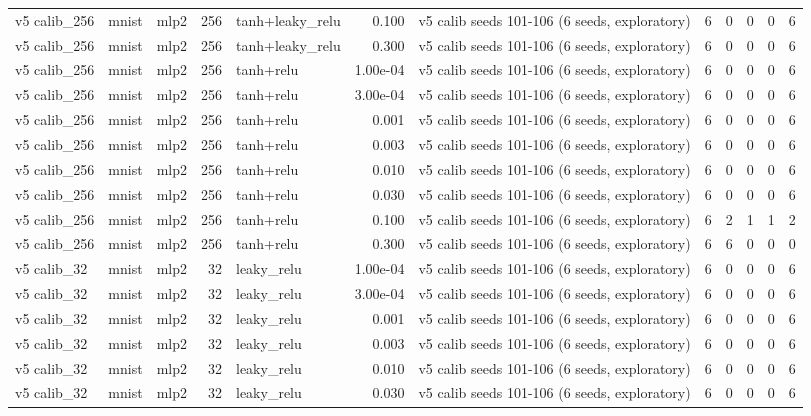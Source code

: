 \begin{table}[htbp]
{\begin{tabular}{@{}lllrlrlrrrrr@{}}
v5 calib\_256 & mnist & mlp2 & 256 & tanh+leaky\_relu & 0.100 & v5 calib seeds 101-106 (6 seeds, exploratory) & 6 & 0 & 0 & 0 & 6 \\
v5 calib\_256 & mnist & mlp2 & 256 & tanh+leaky\_relu & 0.300 & v5 calib seeds 101-106 (6 seeds, exploratory) & 6 & 0 & 0 & 0 & 6 \\
v5 calib\_256 & mnist & mlp2 & 256 & tanh+relu & 1.00e-04 & v5 calib seeds 101-106 (6 seeds, exploratory) & 6 & 0 & 0 & 0 & 6 \\
v5 calib\_256 & mnist & mlp2 & 256 & tanh+relu & 3.00e-04 & v5 calib seeds 101-106 (6 seeds, exploratory) & 6 & 0 & 0 & 0 & 6 \\
v5 calib\_256 & mnist & mlp2 & 256 & tanh+relu & 0.001 & v5 calib seeds 101-106 (6 seeds, exploratory) & 6 & 0 & 0 & 0 & 6 \\
v5 calib\_256 & mnist & mlp2 & 256 & tanh+relu & 0.003 & v5 calib seeds 101-106 (6 seeds, exploratory) & 6 & 0 & 0 & 0 & 6 \\
v5 calib\_256 & mnist & mlp2 & 256 & tanh+relu & 0.010 & v5 calib seeds 101-106 (6 seeds, exploratory) & 6 & 0 & 0 & 0 & 6 \\
v5 calib\_256 & mnist & mlp2 & 256 & tanh+relu & 0.030 & v5 calib seeds 101-106 (6 seeds, exploratory) & 6 & 0 & 0 & 0 & 6 \\
v5 calib\_256 & mnist & mlp2 & 256 & tanh+relu & 0.100 & v5 calib seeds 101-106 (6 seeds, exploratory) & 6 & 2 & 1 & 1 & 2 \\
v5 calib\_256 & mnist & mlp2 & 256 & tanh+relu & 0.300 & v5 calib seeds 101-106 (6 seeds, exploratory) & 6 & 6 & 0 & 0 & 0 \\
v5 calib\_32 & mnist & mlp2 & 32 & leaky\_relu & 1.00e-04 & v5 calib seeds 101-106 (6 seeds, exploratory) & 6 & 0 & 0 & 0 & 6 \\
v5 calib\_32 & mnist & mlp2 & 32 & leaky\_relu & 3.00e-04 & v5 calib seeds 101-106 (6 seeds, exploratory) & 6 & 0 & 0 & 0 & 6 \\
v5 calib\_32 & mnist & mlp2 & 32 & leaky\_relu & 0.001 & v5 calib seeds 101-106 (6 seeds, exploratory) & 6 & 0 & 0 & 0 & 6 \\
v5 calib\_32 & mnist & mlp2 & 32 & leaky\_relu & 0.003 & v5 calib seeds 101-106 (6 seeds, exploratory) & 6 & 0 & 0 & 0 & 6 \\
v5 calib\_32 & mnist & mlp2 & 32 & leaky\_relu & 0.010 & v5 calib seeds 101-106 (6 seeds, exploratory) & 6 & 0 & 0 & 0 & 6 \\
v5 calib\_32 & mnist & mlp2 & 32 & leaky\_relu & 0.030 & v5 calib seeds 101-106 (6 seeds, exploratory) & 6 & 0 & 0 & 0 & 6 \\

\end{tabular}}
\end{table}
